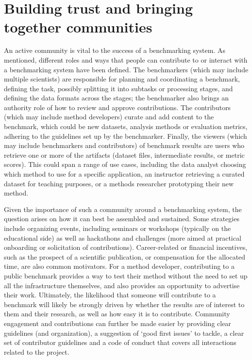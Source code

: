 \documentclass[11pt]{article}
\begin{document}
\section*{Building trust and bringing together communities}

An active community is vital to the success of a benchmarking system. As mentioned, different roles and ways that people can contribute to or interact with a benchmarking system have been defined. The benchmarkers (which may include multiple scientists) are responsible for planning and coordinating a benchmark, defining the task, possibly splitting it into subtasks or processing stages, and defining the data formats across the stages; the benchmarker also brings an authority role of how to review and approve contributions. The contributors (which may include method developers) curate and add content to the benchmark, which could be new datasets, analysis methods or evaluation metrics, adhering to the guidelines set up by the benchmarker. Finally, the viewers (which may include benchmarkers and contributors) of benchmark results are users who retrieve one or more of the artifacts (dataset files, intermediate results, or metric scores). This could span a range of use cases, including the data analyst choosing which method to use for a specific application, an instructor retrieving a curated dataset for teaching purposes, or a methods researcher prototyping their new method.

Given the importance of such a community around a benchmarking system, the question arises on how it can best be assembled and sustained. Some strategies include organizing events, including seminars or workshops (typically on the educational side) as well as hackathons and challenges (more aimed at practical onboarding or solicitation of contributions). Career-related or financial incentives, such as the prospect of a scientific publication, or compensation for the allocated time, are also common motivators. For a method developer, contributing to a public benchmark provides a way to test their method without the need to set up all the infrastructure themselves, and also provides an opportunity to advertise their work. Ultimately, the likelihood that someone will contribute to a benchmark will likely be strongly driven by whether the results are of interest to them and their research, as well as how easy it is to contribute. Community engagement and contributions can further be made easier by providing clear guidelines (and organization), a suggestion of `good first issues' to tackle, a clear set of contributor guidelines and a code of conduct that covers all interactions related to the project.
\end{document}
